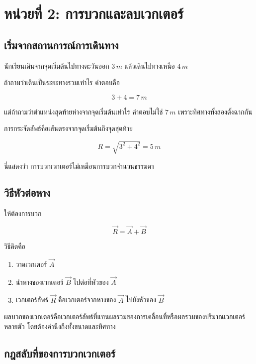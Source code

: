 \documentclass[12pt,a4paper]{report}
\begin{document}
\section{หน่วยที่ 2: การบวกและลบเวกเตอร์}

\subsection{เริ่มจากสถานการณ์การเดินทาง}

นักเรียนเดินจากจุดเริ่มต้นไปทางตะวันออก $3\,\si{m}$ แล้วเดินไปทางเหนือ $4\,\si{m}$

ถ้าถามว่าเดินเป็นระยะทางรวมเท่าไร คำตอบคือ

\[
3+4=7\,\si{m}
\]

แต่ถ้าถามว่าตำแหน่งสุดท้ายห่างจากจุดเริ่มต้นเท่าไร คำตอบไม่ใช่ $7\,\si{m}$ เพราะทิศทางทั้งสองตั้งฉากกัน

การกระจัดลัพธ์คือเส้นตรงจากจุดเริ่มต้นถึงจุดสุดท้าย

\[
R=\sqrt{3^2+4^2}=5\,\si{m}
\]

นี่แสดงว่า การบวกเวกเตอร์ไม่เหมือนการบวกจำนวนธรรมดา

\subsection{วิธีหัวต่อหาง}

ให้ต้องการบวก

\[
\vec{R}=\vec{A}+\vec{B}
\]

วิธีคิดคือ

\begin{enumerate}
    \item วาดเวกเตอร์ $\vec{A}$
    \item นำหางของเวกเตอร์ $\vec{B}$ ไปต่อที่หัวของ $\vec{A}$
    \item เวกเตอร์ลัพธ์ $\vec{R}$ คือเวกเตอร์จากหางของ $\vec{A}$ ไปยังหัวของ $\vec{B}$
\end{enumerate}

\begin{tcolorbox}[title=นิยามการบวกเวกเตอร์]
ผลบวกของเวกเตอร์คือเวกเตอร์ลัพธ์ที่แทนผลรวมของการเคลื่อนที่หรือผลรวมของปริมาณเวกเตอร์หลายตัว โดยต้องคำนึงถึงทั้งขนาดและทิศทาง
\end{tcolorbox}

\subsection{กฎสลับที่ของการบวกเวกเตอร์}
\end{document}
